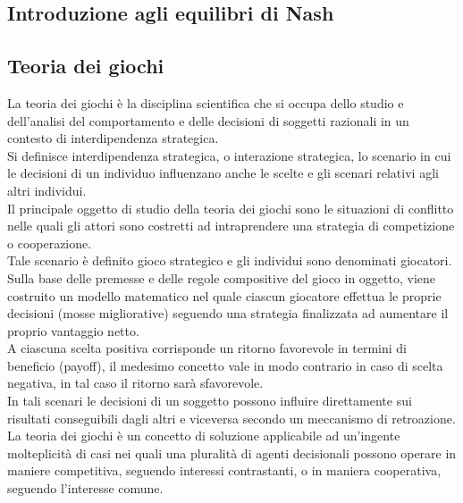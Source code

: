 \begin{flushleft}
\justify

\chapter{Introduzione agli equilibri di Nash}

\section{Teoria dei giochi}
La teoria dei giochi è la disciplina scientifica che si occupa dello studio e dell'analisi del comportamento e delle decisioni di soggetti razionali in un contesto di interdipendenza strategica.\\
Si definisce interdipendenza strategica, o interazione strategica, lo scenario in cui le decisioni di un individuo influenzano anche le scelte e gli scenari relativi agli altri individui.\\
Il principale oggetto di studio della teoria dei giochi sono le situazioni di conflitto nelle quali gli attori sono costretti ad intraprendere una strategia di competizione o cooperazione.\\
Tale scenario è definito gioco strategico e gli individui sono denominati giocatori.\\
Sulla base delle premesse e delle regole compositive del gioco in oggetto, viene costruito un modello matematico nel quale ciascun giocatore effettua le proprie decisioni (mosse migliorative) seguendo una strategia finalizzata ad aumentare il proprio vantaggio netto.\\
A ciascuna scelta positiva corrisponde un ritorno favorevole in termini di beneficio (payoff), il medesimo concetto vale in modo contrario in caso di scelta negativa, in tal caso il ritorno sarà sfavorevole.\\
In tali scenari le decisioni di un soggetto possono influire direttamente sui risultati conseguibili dagli altri e viceversa secondo un meccanismo di retroazione.\\
La teoria dei giochi è un concetto di soluzione applicabile ad un'ingente molteplicità di casi nei quali una pluralità di agenti decisionali possono operare in maniere competitiva, seguendo interessi contrastanti, o in maniera  cooperativa, seguendo l'interesse comune.\newline


\end{flushleft}
